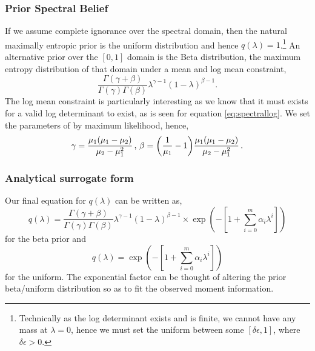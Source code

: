 \documentclass[letterpaper]{article} %
\begin{document}






\subsubsection{Prior Spectral Belief}
If we assume complete ignorance over the spectral domain, then the natural maximally entropic prior is the uniform distribution and hence $q(\lambda) = 1$.\footnote{Technically as the log determinant exists and is finite, we cannot have any mass at $\lambda=0$, hence we must set the uniform between some $[\delta\epsilon,1]$, where $\delta\epsilon >0$.}
An alternative prior over the $[0,1]$ domain is the Beta distribution, the maximum entropy distribution of that domain under a mean and log mean constraint,
\begin{equation}
\frac{\Gamma(\gamma+\beta)}{\Gamma(\gamma)\Gamma(\beta)}\lambda^{\gamma-1}(1-\lambda)^{\beta-1}.
\end{equation}
The log mean constraint is particularly interesting as we know that it must exists for a valid log determinant to exist, as is seen for equation \eqref{eq:spectrallog}.  We set the parameters of by maximum likelihood, hence,
\begin{equation}
\gamma = \frac{\mu_{1}(\mu_{1}-\mu_{2})}{\mu_{2}-\mu_{1}^{2}}\thinspace , \thinspace \beta = \bigg(\frac{1}{\mu_{1}}-1\bigg)\frac{\mu_{1}(\mu_{1}-\mu_{2})}{\mu_{2}-\mu_{1}^{2}}\thinspace.
\end{equation}

\subsubsection{Analytical surrogate form}
Our final equation for $q(\lambda)$ can be written as,
\begin{equation}
q(\lambda) = \frac{\Gamma(\gamma+\beta)}{\Gamma(\gamma)\Gamma(\beta)}\lambda^{\gamma-1}(1-\lambda)^{\beta-1}\times\exp(-[1+\sum_{i=0}^{m}\alpha_{i}\lambda^{i}])
\end{equation}
for the beta prior and 
\begin{equation}
q(\lambda) = \exp(-[1+\sum_{i=0}^{m}\alpha_{i}\lambda^{i}])
\end{equation}
for the uniform. The exponential factor can be thought of altering the prior beta/uniform distribution so as to fit the observed moment information. 
\end{document}
